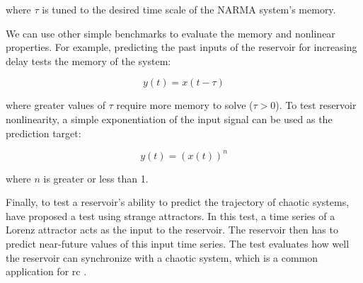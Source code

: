 where $\tau$ is tuned to the desired time scale of the NARMA system's memory.


We can use other simple benchmarks to evaluate the memory and nonlinear properties.
For example, predicting the past inputs of the reservoir for increasing delay tests the memory of the system:

\begin{equation} \label{prc:delay-line-benchmark}
    y(t) = x(t-\tau)
\end{equation}

where greater values of $\tau$ require more memory to solve ($\tau > 0$). 
To test reservoir nonlinearity, a simple exponentiation of the input signal can be used as the prediction target:

\begin{equation} \label{prc:polynomial-benchmark}
    y(t) = (x(t))^{n}
\end{equation}

where $n$ is greater or less than 1.


Finally, to test a reservoir's ability to predict the trajectory of chaotic systems, \citet{ushio_computational_2021} have proposed a test using strange attractors.
In this test, a time series of a Lorenz attractor acts as the input to the reservoir.
The reservoir then has to predict near-future values of this input time series.
The test evaluates how well the reservoir can synchronize with a chaotic system, which is a common application for \acrshort{rc} \citep{tanaka_recent_2019}.
